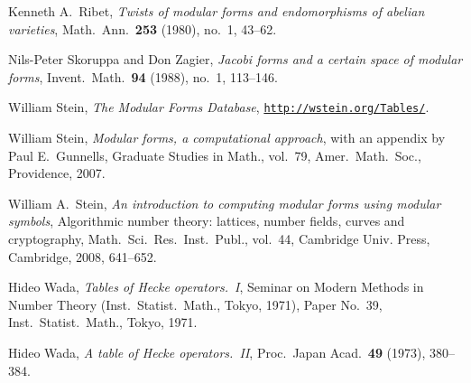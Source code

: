 \documentclass[11pt]{amsart}
\numberwithin{equation}{subsection}
\theoremstyle{plain}
\theoremstyle{definition}
\begin{document}
\begin{thebibliography}{999}
Kenneth A.\ Ribet, \emph{Twists of modular forms and endomorphisms of abelian varieties}, Math.\ Ann.\ \textbf{253} (1980), no.\ 1, 43--62.

Nils-Peter Skoruppa and Don Zagier, \emph{Jacobi forms and a certain space of modular forms}, Invent.\ Math.\ \textbf{94} (1988), no.\ 1, 113--146.

William Stein, \emph{The Modular Forms Database}, \href{http://wstein.org/Tables/}{\texttt{http://wstein.org/Tables/}}.

William Stein, \emph{Modular forms, a computational approach}, with an appendix by Paul E.\ Gunnells, Graduate Studies in Math., vol.~79, Amer.\ Math.\ Soc., Providence, 2007.

William A.\ Stein, \emph{An introduction to computing modular forms using modular symbols}, Algorithmic number theory: lattices, number fields, curves and cryptography, Math.\ Sci.\ Res.\ Inst.\ Publ., vol.\ 44, Cambridge Univ. Press, Cambridge, 2008, 641--652.

Hideo Wada, \emph{Tables of Hecke operators.\ I}, Seminar on Modern Methods in Number Theory (Inst.\ Statist.\ Math., Tokyo, 1971), Paper No.\ 39, Inst.\ Statist.\ Math., Tokyo, 1971. 

Hideo Wada, \emph{A table of Hecke operators.\ II}, Proc.\ Japan Acad.\ \textbf{49} (1973), 380--384. 

\end{thebibliography}
\end{document}
